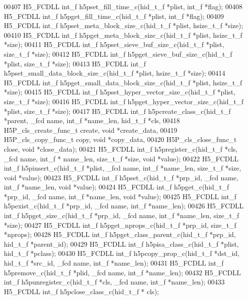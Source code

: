 \begin{DoxyCode}
00407 H5\_FCDLL int\_f h5pset\_fill\_time\_c(hid\_t\_f *plist, int\_f *flag);
00408 H5\_FCDLL int\_f h5pget\_fill\_time\_c(hid\_t\_f *plist, int\_f *flag);
00409 H5\_FCDLL int\_f h5pset\_meta\_block\_size\_c(hid\_t\_f *plist, hsize\_t\_f *size);
00410 H5\_FCDLL int\_f h5pget\_meta\_block\_size\_c(hid\_t\_f *plist, hsize\_t\_f *size);
00411 H5\_FCDLL int\_f h5pset\_sieve\_buf\_size\_c(hid\_t\_f *plist, size\_t\_f *size);
00412 H5\_FCDLL int\_f h5pget\_sieve\_buf\_size\_c(hid\_t\_f *plist, size\_t\_f *size);
00413 H5\_FCDLL int\_f h5pset\_small\_data\_block\_size\_c(hid\_t\_f *plist, hsize\_t\_f *size);
00414 H5\_FCDLL int\_f h5pget\_small\_data\_block\_size\_c(hid\_t\_f *plist, hsize\_t\_f *size);
00415 H5\_FCDLL int\_f h5pset\_hyper\_vector\_size\_c(hid\_t\_f *plist, size\_t\_f *size);
00416 H5\_FCDLL int\_f h5pget\_hyper\_vector\_size\_c(hid\_t\_f *plist, size\_t\_f *size);
00417 H5\_FCDLL int\_f h5pcreate\_class\_c(hid\_t\_f *parent, \_fcd name, int\_f *name\_len, hid\_t\_f *cls,
00418                   H5P\_cls\_create\_func\_t create, \textcolor{keywordtype}{void} *create\_data,
00419                   H5P\_cls\_copy\_func\_t copy, \textcolor{keywordtype}{void} *copy\_data,
00420                   H5P\_cls\_close\_func\_t close, \textcolor{keywordtype}{void} *close\_data);
00421 H5\_FCDLL int\_f h5pregister\_c(hid\_t\_f *cls, \_fcd name, int\_f * name\_len, size\_t\_f *size, \textcolor{keywordtype}{void} *value);
00422 H5\_FCDLL int\_f h5pinsert\_c(hid\_t\_f  *plist, \_fcd name, int\_f *name\_len, size\_t\_f *size, \textcolor{keywordtype}{void} *value);
00423 H5\_FCDLL int\_f h5pset\_c(hid\_t\_f *prp\_id, \_fcd name, int\_f *name\_len, \textcolor{keywordtype}{void} *value);
00424 H5\_FCDLL int\_f h5pget\_c(hid\_t\_f *prp\_id, \_fcd name, int\_f *name\_len, \textcolor{keywordtype}{void} *value);
00425 H5\_FCDLL int\_f h5pexist\_c(hid\_t\_f *prp\_id, \_fcd name, int\_f *name\_len);
00426 H5\_FCDLL int\_f h5pget\_size\_c(hid\_t\_f *prp\_id, \_fcd name, int\_f *name\_len, size\_t\_f *size);
00427 H5\_FCDLL int\_f h5pget\_nprops\_c(hid\_t\_f *prp\_id, size\_t\_f *nprops);
00428 H5\_FCDLL int\_f h5pget\_class\_parent\_c(hid\_t\_f *prp\_id, hid\_t\_f *parent\_id);
00429 H5\_FCDLL int\_f h5pisa\_class\_c(hid\_t\_f *plist, hid\_t\_f *pclass);
00430 H5\_FCDLL int\_f h5pcopy\_prop\_c(hid\_t\_f *dst\_id, hid\_t\_f *src\_id, \_fcd name, int\_f *name\_len);
00431 H5\_FCDLL int\_f h5premove\_c(hid\_t\_f *plid, \_fcd name, int\_f *name\_len);
00432 H5\_FCDLL int\_f h5punregister\_c(hid\_t\_f *cls, \_fcd name, int\_f *name\_len);
00433 H5\_FCDLL int\_f h5pclose\_class\_c(hid\_t\_f * cls);

\end{DoxyCode}

